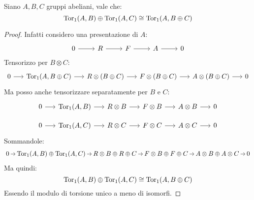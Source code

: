 \begin{lemma}
  Siano $ A, B, C $ gruppi abeliani, vale che:
  \[
    \mathrm{Tor_1}( A, B) \oplus \mathrm{Tor_1}( A, C) \cong \mathrm{Tor_1}( A, B \oplus C)
  \]
\end{lemma}
\begin{proof}
  Infatti considero una presentazione di $ A $:
  \[
    \begin{tikzcd}
      0 \rar & R \rar & F \rar & A \rar & 0
    \end{tikzcd}
  \]
  Tensorizzo per $ B \otimes C $:
  \[
    \begin{tikzcd}[nodes = {column sep = 15pt}]
      0 \rar & \tor{A, B \oplus C} \rar & R \otimes (B \oplus C) \rar & F \otimes (B \oplus C)\rar & A \otimes (B \oplus C) \rar & 0
    \end{tikzcd}
  \]
  Ma posso anche tensorizzare separatamente per $ B $ e $ C $:
  \[
    \begin{tikzcd}[nodes = {column sep = 15pt, row sep = 10 pt}]
      0 \rar & \tor{A, B } \rar & R \otimes B \rar & F \otimes B \rar & A \otimes B \rar & 0 \\
      0 \rar & \tor{A, C} \rar & R \otimes C \rar & F \otimes C \rar & A \otimes C \rar & 0
    \end{tikzcd}
  \]
  Sommandole:
  \[
    \begin{tikzcd}[nodes = {column sep = 8pt, inner sep = 2pt, outer sep = 0.5pt}]
      0 \rar & \tor{A, B} \oplus \tor{A, C} \rar & R \otimes B \oplus R \oplus C \rar & F \otimes B \oplus F \oplus C \rar & A \otimes B \oplus A \otimes C  \rar & 0
    \end{tikzcd}
  \]
  Ma quindi:
  \[
    \mathrm{Tor_1}( A, B) \oplus \mathrm{Tor_1}( A, C) \cong \mathrm{Tor_1}( A, B \oplus C)
  \]
  Essendo il modulo di torsione unico a meno di isomorfi.
 \end{proof}


